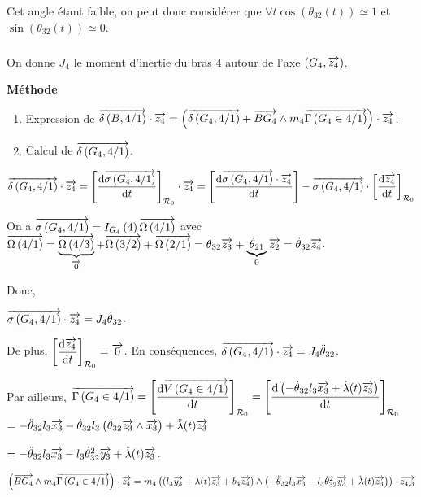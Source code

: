 \documentclass[10pt,fleqn]{article} %
\begin{document}
Cet angle étant faible, on peut donc considérer que $\forall t \cos \left(\theta_{32}(t)\right)\simeq 1$ et $\sin\left(\theta_{32}(t)\right)\simeq 0$.

\subparagraph{}%

On donne $J_4$ le moment d'inertie du bras 4 autour de l'axe $\axe{G_4}{z_4}$.

\textbf{Méthode}
\begin{enumerate}
\item Expression de $\vectmd{B}{4}{1}\cdot\vect{z_4} = \left( \vectmd{G_4}{4}{1} + \vect{BG_4}\wedge m_4 \vectg{G_4}{4}{1}\right)\cdot\vect{z_4}$.
\item Calcul de $\vectmd{G_4}{4}{1}$.
\end{enumerate}

$\vectmd{G_4}{4}{1} \cdot\vect{z_4} = \left[ \dfrac{\dd \vectmc{G_4}{4}{1}}{\dd t} \right]_{\rep{0}}\cdot\vect{z_4}
=\left[ \dfrac{\dd \vectmc{G_4}{4}{1}\cdot \vect{z_4}}{\dd t} \right]-\vectmc{G_4}{4}{1}\cdot\left[ \dfrac{\dd \vect{z_4}}{\dd t} \right]_{\rep{0}}$



On a $\vectmc{G_4}{4}{1} =\inertie{G_4}{4} \vecto{4}{1}$ avec $\vecto{4}{1}=\underbrace{\vecto{4}{3}}_{\vect{0}}+\vecto{3}{2}+\vecto{2}{1} =\dot{\theta}_{32} \vect{z_3}+\underbrace{\dot{\theta}_{21}}_{0} \vect{z_2}=\dot{\theta}_{32} \vect{z_4}$.

Donc,

$\vectmc{G_4}{4}{1}\cdot\vect{z_4}=J_4\dot{\theta}_{32} $.

De plus, $ \left[ \dfrac{ \dd \vect{z_4}}{\dd t} \right]_{\rep{0}} = \vect{0} $. 
En conséquences, $\vectmd{G_4}{4}{1} \cdot\vect{z_4}  = J_4\ddot{\theta}_{32}$.

Par ailleurs, $\vectg{G_4}{4}{1}= \left[\dfrac{\dd \vectv{G_4}{4}{1}}{\dd t} \right]_{\rep{0}}=\left[\dfrac{\dd \left( -\dot{\theta}_{32}l_3\vect{x_3}  + \dot{\lambda}(t)\vect{z_3} \right)}{\dd t} \right]_{\rep{0}}$
$= -\ddot{\theta}_{32}l_3\vect{x_3} -\dot{\theta}_{32}l_3    \left(\dot{\theta}_{32} \vect{z_3}\wedge \vect{x_3} \right)  + \ddot{\lambda}(t)\vect{z_3}  $

$= -\ddot{\theta}_{32}l_3\vect{x_3} -l_3   \dot{\theta}_{32}^2  \vect{y_3} + \ddot{\lambda}(t)\vect{z_3}  $.

$\left(\vect{BG_4}\wedge m_4 \vectg{G_4}{4}{1}\right)\cdot\vect{z_4} = 
m_4\left( \left(l_3 \vect{y_3} + \lambda(t) \vect{z_3}+ b_4 \vect{z_4}\right) \wedge  \left(-\ddot{\theta}_{32}l_3\vect{x_3} -l_3   \dot{\theta}_{32}^2  \vect{y_3} + \ddot{\lambda}(t)\vect{z_3} \right) \right)\cdot \vect{z_{4,3}}$
\end{document}
